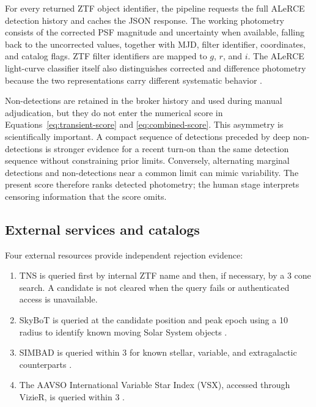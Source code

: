 \documentclass[11pt]{article}
\begin{document}
For every returned ZTF object identifier, the pipeline requests the full ALeRCE detection history and caches the JSON response. The working photometry consists of the corrected PSF magnitude and uncertainty when available, falling back to the uncorrected values, together with MJD, filter identifier, coordinates, and catalog flags. ZTF filter identifiers are mapped to $g$, $r$, and $i$. The ALeRCE light-curve classifier itself also distinguishes corrected and difference photometry because the two representations carry different systematic behavior \citep{sanchezsaez2021}.

Non-detections are retained in the broker history and used during manual adjudication, but they do not enter the numerical score in Equations~\ref{eq:transient-score} and \ref{eq:combined-score}. This asymmetry is scientifically important. A compact sequence of detections preceded by deep non-detections is stronger evidence for a recent turn-on than the same detection sequence without constraining prior limits. Conversely, alternating marginal detections and non-detections near a common limit can mimic variability. The present score therefore ranks detected photometry; the human stage interprets censoring information that the score omits.

\subsection{External services and catalogs}

Four external resources provide independent rejection evidence:

\begin{enumerate}
  \item TNS is queried first by internal ZTF name and then, if necessary, by a \SI{3}{\arcsec} cone search. A candidate is not cleared when the query fails or authenticated access is unavailable.
  \item SkyBoT is queried at the candidate position and peak epoch using a \SI{10}{\arcsec} radius to identify known moving Solar System objects \citep{berthier2006}.
  \item SIMBAD is queried within \SI{3}{\arcsec} for known stellar, variable, and extragalactic counterparts \citep{wenger2000}.
  \item The AAVSO International Variable Star Index (VSX), accessed through VizieR, is queried within \SI{3}{\arcsec} \citep{ochsenbein2000,watson2006}.
\end{enumerate}
\end{document}
